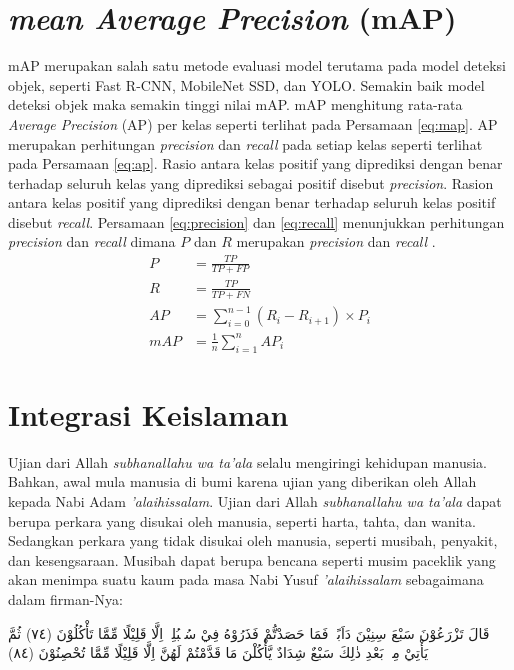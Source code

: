 \section{\textit{mean Average Precision} (mAP)}
mAP merupakan salah satu metode evaluasi model terutama pada model deteksi objek, seperti Fast R-CNN, MobileNet SSD, dan YOLO. Semakin baik model deteksi objek maka semakin tinggi nilai mAP. mAP menghitung rata-rata \textit{Average Precision} (AP) per kelas seperti terlihat pada Persamaan \ref{eq:map}. AP merupakan perhitungan \textit{precision} dan \textit{recall} pada setiap kelas seperti terlihat pada Persamaan \ref{eq:ap}. Rasio antara kelas positif yang diprediksi dengan benar terhadap seluruh kelas yang diprediksi sebagai positif disebut \textit{precision}. Rasion antara kelas positif yang diprediksi dengan benar terhadap seluruh kelas positif disebut \textit{recall}. Persamaan \ref{eq:precision} dan \ref{eq:recall} menunjukkan perhitungan \textit{precision} dan \textit{recall} dimana $P$ dan $R$ merupakan \textit{precision} dan \textit{recall} \citep{Shultz2017}.
\begin{align}
    \label{eq:precision}
    P &= \frac{TP}{TP+FP}\\
    \label{eq:recall}
    R &= \frac{TP}{TP+FN}\\
    \label{eq:ap}
    AP &= \sum_{i=0}^{n-1} (R_i-R_{i+1})\times P_i\\
    \label{eq:map}
    mAP &= \frac{1}{n}\sum_{i=1}^{n} AP_i
\end{align}

\section{Integrasi Keislaman}
Ujian dari Allah \textit{subhanallahu wa ta'ala} selalu mengiringi kehidupan manusia. Bahkan, awal mula manusia di bumi karena ujian yang diberikan oleh Allah kepada Nabi Adam \textit{'alaihissalam}. Ujian dari Allah \textit{subhanallahu wa ta'ala} dapat berupa perkara yang disukai oleh manusia, seperti harta, tahta, dan wanita. Sedangkan perkara yang tidak disukai oleh manusia, seperti musibah, penyakit, dan kesengsaraan. Musibah dapat berupa bencana seperti musim paceklik yang akan menimpa suatu kaum pada masa Nabi Yusuf \textit{'alaihissalam} sebagaimana dalam firman-Nya:

\begin{flushright}
    \begin{RLtext}
        قَالَ تَزْرَعُوْنَ سَبْعَ سِنِيْنَ دَاَبًاۚ فَمَا حَصَدْتُّمْ فَذَرُوْهُ فِيْ سُنْۢبُلِهٖٓ اِلَّا قَلِيْلًا مِّمَّا تَأْكُلُوْنَ (٧٤) ثُمَّ يَأْتِيْ مِنْۢ بَعْدِ ذٰلِكَ سَبْعٌ شِدَادٌ يَّأْكُلْنَ مَا قَدَّمْتُمْ لَهُنَّ اِلَّا قَلِيْلًا مِّمَّا تُحْصِنُوْنَ (٨٤)
    \end{RLtext}
\end{flushright}

